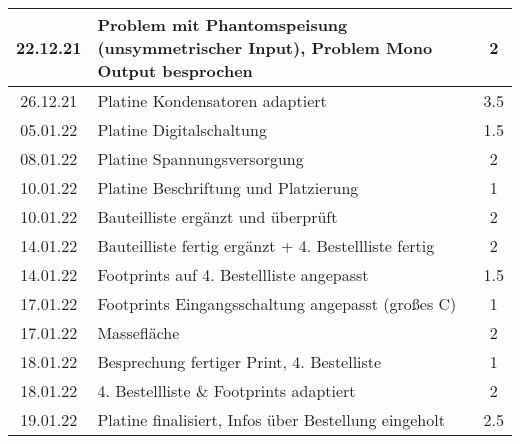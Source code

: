 \begin{longtable}{c|p{10cm}|c}
    22.12.21       & Problem mit Phantomspeisung (unsymmetrischer \newline Input), Problem   Mono Output besprochen                & 2                \\ \hline
    26.12.21       & Platine Kondensatoren adaptiert                                                                               & 3.5              \\ \hline
    05.01.22       & Platine Digitalschaltung                                                                                      & 1.5              \\ \hline
    08.01.22       & Platine Spannungsversorgung                                                                                   & 2                \\ \hline
    10.01.22       & Platine Beschriftung und Platzierung                                                                          & 1                \\ \hline
    10.01.22       & Bauteilliste ergänzt und überprüft                                                                            & 2                \\ \hline
    14.01.22       & Bauteilliste fertig ergänzt + 4. Bestellliste fertig                                                          & 2                \\ \hline
    14.01.22       & Footprints auf 4. Bestellliste angepasst                                                                      & 1.5              \\ \hline
    17.01.22       & Footprints Eingangsschaltung angepasst (großes C)                                                             & 1                \\ \hline
    17.01.22       & Massefläche                                                                                                   & 2                \\ \hline
    18.01.22       & Besprechung fertiger Print, 4. Bestelliste                                                                    & 1                \\ \hline
    18.01.22       & 4. Bestellliste \& Footprints adaptiert                                                                       & 2                \\ \hline
    19.01.22       & Platine finalisiert, Infos über Bestellung eingeholt                                                          & 2.5              \\ \hline

\end{longtable}
